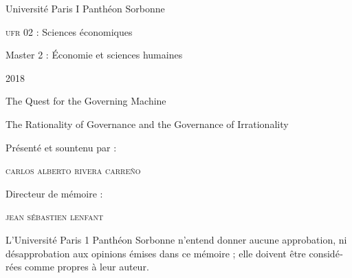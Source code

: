\documentclass[paper=B6,portrait,twoside=true,twocolumn=false,headinclude=true,footinclude=false,fontsize=12,BCOR=10mm,DIV=calc,pagesize=auto,titlepage=firstiscover,mpinclude=false,headings=normal,headings=twolinechapter,open=right,toc=graduated,chapterprefix=false,numbers=endperiod,parskip=half+]{scrbook}
\author{Carlos Alberto Rivera Carreño}
\date{}
\title{}
\theoremstyle{definition}
\begin{document}
\begin{titlepage}
 \centering
 \vspace{4\baselineskip}
\begin{french}
 {\large Université Paris I Panthéon Sorbonne \par}
 {\large \textsc{ufr} 02 : Sciences économiques  \par}
 {\normalsize Master 2 : Économie et sciences humaines \par}
 {\normalsize 2018 \par}
\end{french}
 \vspace{2\baselineskip}
 {\huge The Quest for the Governing Machine \par}
 {\large The Rationality of Governance and the Governance of Irrationality \par}
\vspace*{\fill}
\begin{french}
 {\normalsize Présenté et sountenu par : \par}
\end{french}
 {\normalsize \textsc{carlos alberto rivera carreño}\par}
 \vspace{1\baselineskip}
\begin{french}
 {\normalsize Directeur de mémoire : \par}
\end{french}
 {\normalsize \textsc{jean sébastien lenfant}\par}
\end{titlepage}

\pagestyle{empty}

\begin{french}
L'Université Paris 1 Panthéon Sorbonne n'entend donner aucune approbation,
ni désapprobation aux opinions émises dans ce mémoire ; elle doivent être
considérées comme propres à leur auteur. 
\end{french}
\end{document}
